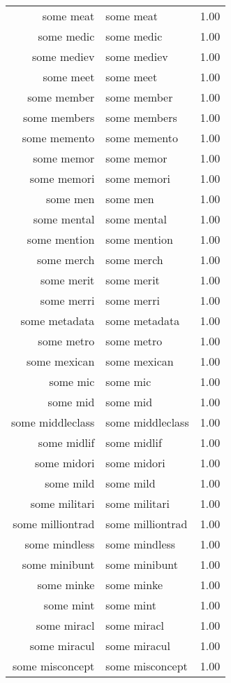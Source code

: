 \begin{table}[ht]
\begin{tabular}{rlr}
  some meat & some meat & 1.00 \\ 
  some medic & some medic & 1.00 \\ 
  some mediev & some mediev & 1.00 \\ 
  some meet & some meet & 1.00 \\ 
  some member & some member & 1.00 \\ 
  some members & some members & 1.00 \\ 
  some memento & some memento & 1.00 \\ 
  some memor & some memor & 1.00 \\ 
  some memori & some memori & 1.00 \\ 
  some men & some men & 1.00 \\ 
  some mental & some mental & 1.00 \\ 
  some mention & some mention & 1.00 \\ 
  some merch & some merch & 1.00 \\ 
  some merit & some merit & 1.00 \\ 
  some merri & some merri & 1.00 \\ 
  some metadata & some metadata & 1.00 \\ 
  some metro & some metro & 1.00 \\ 
  some mexican & some mexican & 1.00 \\ 
  some mic & some mic & 1.00 \\ 
  some mid & some mid & 1.00 \\ 
  some middleclass & some middleclass & 1.00 \\ 
  some midlif & some midlif & 1.00 \\ 
  some midori & some midori & 1.00 \\ 
  some mild & some mild & 1.00 \\ 
  some militari & some militari & 1.00 \\ 
  some milliontrad & some milliontrad & 1.00 \\ 
  some mindless & some mindless & 1.00 \\ 
  some minibunt & some minibunt & 1.00 \\ 
  some minke & some minke & 1.00 \\ 
  some mint & some mint & 1.00 \\ 
  some miracl & some miracl & 1.00 \\ 
  some miracul & some miracul & 1.00 \\ 
  some misconcept & some misconcept & 1.00 \\ 

\end{tabular}
\end{table}
